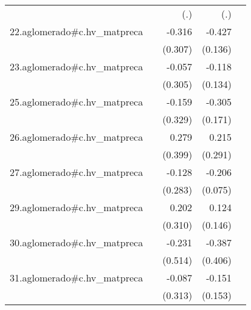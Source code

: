 {\begin{longtable}{l*{4}{D{.}{.}{-1}}}
            &                     &         (.)         &         (.)         &                     \\
\addlinespace
22.aglomerado#c.hv\_matpreca&                     &      -0.316         &      -0.427\sym{**} &                     \\
            &                     &     (0.307)         &     (0.136)         &                     \\
\addlinespace
23.aglomerado#c.hv\_matpreca&                     &      -0.057         &      -0.118         &                     \\
            &                     &     (0.305)         &     (0.134)         &                     \\
\addlinespace
25.aglomerado#c.hv\_matpreca&                     &      -0.159         &      -0.305         &                     \\
            &                     &     (0.329)         &     (0.171)         &                     \\
\addlinespace
26.aglomerado#c.hv\_matpreca&                     &       0.279         &       0.215         &                     \\
            &                     &     (0.399)         &     (0.291)         &                     \\
\addlinespace
27.aglomerado#c.hv\_matpreca&                     &      -0.128         &      -0.206\sym{**} &                     \\
            &                     &     (0.283)         &     (0.075)         &                     \\
\addlinespace
29.aglomerado#c.hv\_matpreca&                     &       0.202         &       0.124         &                     \\
            &                     &     (0.310)         &     (0.146)         &                     \\
\addlinespace
30.aglomerado#c.hv\_matpreca&                     &      -0.231         &      -0.387         &                     \\
            &                     &     (0.514)         &     (0.406)         &                     \\
\addlinespace
31.aglomerado#c.hv\_matpreca&                     &      -0.087         &      -0.151         &                     \\
            &                     &     (0.313)         &     (0.153)         &                     \\

\end{longtable}}
